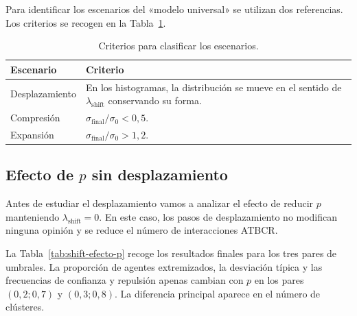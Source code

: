 \documentclass[11pt,a4paper]{article}
\begin{document}
Para identificar los escenarios del «modelo universal» se utilizan dos referencias. Los criterios se recogen en la Tabla~\ref{tab:shift-criterios}.

\begin{table}[htbp]
\centering
\caption{Criterios para clasificar los escenarios.}
\label{tab:shift-criterios}
\begin{tabular}{p{3cm}p{9.8cm}}
\toprule
Escenario & Criterio \\
\midrule
Desplazamiento & En los histogramas, la distribución se mueve en el sentido de $\lambda_{\mathrm{shift}}$ conservando su forma. \\
Compresión & $\sigma_{\mathrm{final}}/\sigma_0<0{,}5$. \\
Expansión & $\sigma_{\mathrm{final}}/\sigma_0>1{,}2$. \\
\bottomrule
\end{tabular}
\end{table}


\subsection{Efecto de $p$ sin desplazamiento}
\label{sec:shift-efecto-p}

Antes de estudiar el desplazamiento vamos a analizar el efecto de reducir $p$ manteniendo $\lambda_{\mathrm{shift}}=0$. En este caso, los pasos de desplazamiento no modifican ninguna opinión y se reduce el número de interacciones ATBCR.

La Tabla~\ref{tab:shift-efecto-p} recoge los resultados finales para los tres pares de umbrales. La proporción de agentes extremizados, la desviación típica y las frecuencias de confianza y repulsión apenas cambian con $p$ en los pares $(0{,}2;0{,}7)$ y $(0{,}3;0{,}8)$. La diferencia principal aparece en el número de clústeres.
\end{document}
